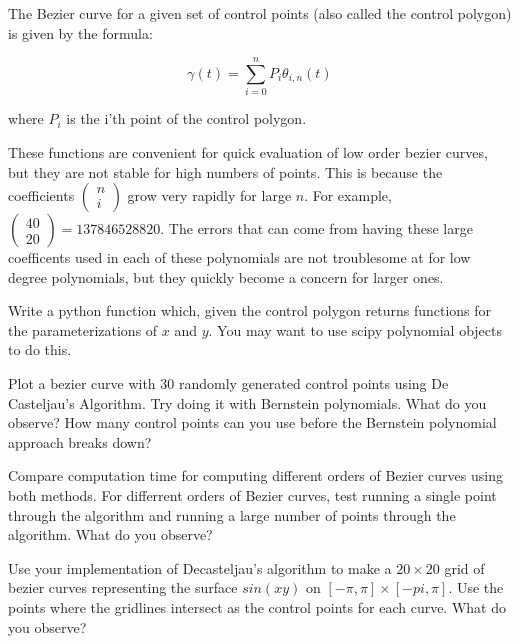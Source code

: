 The Bezier curve for a given set of control points (also called the control polygon) is given by the formula:

$$\gamma (t) = \sum_{i=0}^n P_i \theta_{i,n} (t)$$ 

where $P_i$ is the i'th point of the control polygon.

These functions are convenient for quick evaluation of low order bezier curves, but they are not stable for high numbers of points. 
This is because the coefficients $\left( \begin{smallmatrix} n\\ i \end{smallmatrix} \right)$ grow very rapidly for large $n$. 
For example, $\left( \begin{smallmatrix} 40\\ 20 \end{smallmatrix} \right)=137846528820$. 
The errors that can come from having these large coefficents used in each of these polynomials are not troublesome at for low degree polynomials, but they quickly become a concern for larger ones. 

\begin{problem}
Write a python function which, given the control polygon returns functions for the parameterizations of $x$ and $y$. 
You may want to use scipy polynomial objects to do this.
\end{problem}

\begin{problem}
Plot a bezier curve with 30 randomly generated control points using De Casteljau's Algorithm. 
Try doing it with Bernstein polynomials. 
What do you observe? 
How many control points can you use before the Bernstein polynomial approach breaks down?
\end{problem}

\begin{problem}
Compare computation time for computing different orders of Bezier curves using both methods. 
For differrent orders of Bezier curves, test running a single point through the algorithm and running a large number of points through the algorithm. 
What do you observe?
\end{problem}

\begin{problem}
Use your implementation of Decasteljau's algorithm to make a $20\times 20$ grid of bezier curves representing the surface $sin(xy)$ on $[-\pi,\pi]\times [-pi,\pi]$.
Use the points where the gridlines intersect as the control points for each curve. 
What do you observe?
\end{problem}
